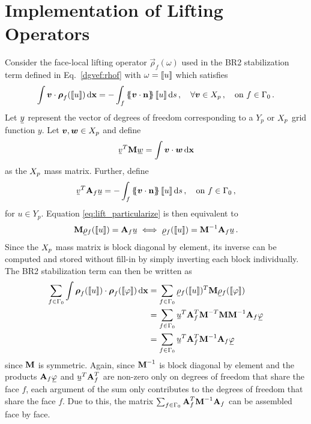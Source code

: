 \documentclass[../doc.tex]{subfiles}
\begin{document}
\section{Implementation of Lifting Operators} \label{dgvef_sec:lifting}
Consider the face-local lifting operator $\vec{\rho}_f(\omega)$ used in the BR2 stabilization term defined in Eq.~\ref{dgvef:rhof} with $\omega = \left\llbracket u \right\rrbracket$ which satisfies
	\begin{equation} \label{eq:lift_particularize}
		\int \boldsymbol{v}\cdot\boldsymbol{\rho}_f(\left\llbracket u \right\rrbracket) \mathop{}\!\mathrm{d} \boldsymbol{\mathrm{x}} = -\int_{f} \left\{\!\!\left\{\boldsymbol{v}\cdot\boldsymbol{\mathrm{n}}\right\}\!\!\right\} \left\llbracket u \right\rrbracket \mathop{}\!\mathrm{d} s \,, \quad \forall \boldsymbol{v} \in X_p\,, \quad \text{on} \ f \in \Gamma_0 \,. 
	\end{equation}
Let $\ubar{y}$ represent the vector of degrees of freedom corresponding to a $Y_p$ or $X_p$ grid function $y$. Let $\boldsymbol{v},\boldsymbol{w} \in X_p$ and define 
	\begin{equation}
		\ubar{v}^T \mat{M} \ubar{w} = \int \vec{v}\cdot\vec{w} \ud \x 
	\end{equation}
as the $X_p$ mass matrix. Further, define 
	\begin{equation}
		\ubar{v}^T \mat{A}_f \ubar{u} = - \int_f \avg{\vec{v}\cdot\n} \jump{u} \ud s \,, \quad \text{on} \ f \in \Gamma_0 \,, 
	\end{equation}
for $u \in Y_p$. 
Equation \ref{eq:lift_particularize} is then equivalent to 
	\begin{equation}
		\mat{M} \ubar{\rho}_f(\jump{u}) = \mat{A}_f \ubar{u} \iff \ubar{\rho}_f(\jump{u}) = \mat{M}^{-1} \mat{A}_f \ubar{u} \,. 
	\end{equation}
Since the $X_p$ mass matrix is block diagonal by element, its inverse can be computed and stored without fill-in by simply inverting each block individually. The BR2 stabilization term can then be written as 
	\begin{equation}
	\begin{aligned}
		\sum_{f\in\Gamma_0}\int \vec{\rho}_f(\jump{u}) \cdot\vec{\rho}_f(\jump{\varphi}) \ud \x &= \sum_{f\in\Gamma_0}\ubar{\rho}_f(\jump{u})^T \mat{M} \ubar{\rho}_f(\jump{\varphi}) \\
		&= \sum_{f\in\Gamma_0}\ubar{u}^T \mat{A}_f^T \mat{M}^{-T} \mat{M} \mat{M}^{-1} \mat{A}_f \ubar{\varphi} \\
		&= \sum_{f\in\Gamma_0}\ubar{u}^T \mat{A}_f^T \mat{M}^{-1} \mat{A}_f \ubar{\varphi} 
	\end{aligned}
	\end{equation}
since $\boldsymbol{\mathrm{M}}$ is symmetric. Again, since $\boldsymbol{\mathrm{M}}^{-1}$ is block diagonal by element and the products $\mat{A}_f\ubar{\varphi}$ and $\ubar{u}^T \mat{A}_f^T$ are non-zero only on degrees of freedom that share the face $f$, each argument of the sum only contributes to the degrees of freedom that share the face $f$. Due to this, the matrix $\sum_{f\in\Gamma_0} \boldsymbol{\mathrm{A}}_f^T \boldsymbol{\mathrm{M}}^{-1} \boldsymbol{\mathrm{A}}_f$ can be assembled face by face. 
\end{document}
